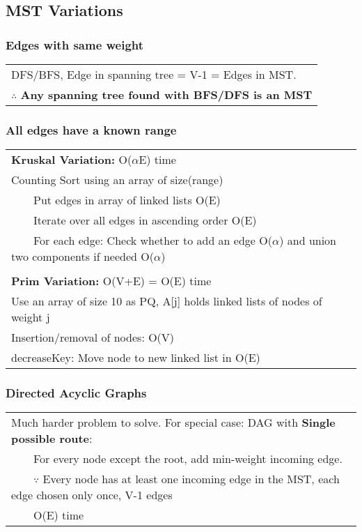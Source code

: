 \documentclass{article}
\newcommand{\tabitem}{~~\llap{\textbullet}~~}
\begin{document}
    \pagebreak

    \subsection{MST Variations}

    \subsubsection{Edges with same weight}

    \begin{tabular}{l}
        DFS/BFS, Edge in spanning tree = V-1 = Edges in MST.\\
        $\therefore$ \textbf{Any spanning tree found with BFS/DFS is an MST}
    \end{tabular}

    \subsubsection{All edges have a known range}
    \begin{tabular}{l}
        \textbf{Kruskal Variation:} O($\alpha$E) time\\
        Counting Sort using an array of size(range)\\
        \tabitem Put edges in array of linked lists O(E)\\
        \tabitem Iterate over all edges in ascending order O(E)\\
        \tabitem For each edge: Check whether to add an edge O($\alpha$) and union two components if needed O($\alpha$)\\\\
        \textbf{Prim Variation: }O(V+E) = O(E) time\\
        Use an array of size 10 as PQ, A[j] holds linked lists of nodes of weight j\\
        Insertion/removal of nodes: O(V)\\
        decreaseKey: Move node to new linked list in O(E)\\

    \end{tabular}

    \subsubsection{Directed Acyclic Graphs}

    \begin{tabular}{l}
        Much harder problem to solve. For special case: DAG with \textbf{Single possible route}:\\
        \tabitem For every node except the root, add min-weight incoming edge.\\
        \tabitem $\because$ Every node has at least one incoming edge in the MST, each edge chosen only once, V-1 edges\\
        \tabitem O(E) time\\
    \end{tabular}
\end{document}
